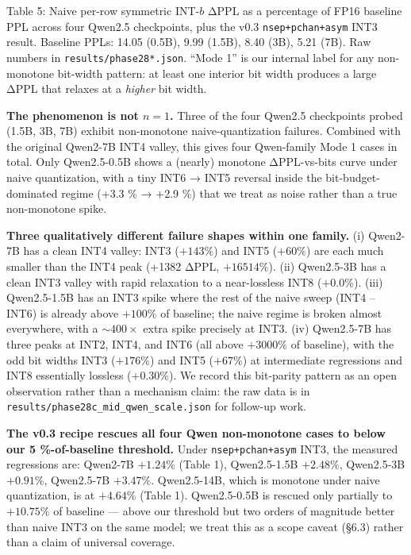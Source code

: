 Table 5: Naive per-row symmetric INT-\(b\) ΔPPL as a percentage of FP16
baseline PPL across four Qwen2.5 checkpoints, plus the v0.3
\texttt{nsep+pchan+asym} INT3 result. Baseline PPLs: 14.05 (0.5B), 9.99
(1.5B), 8.40 (3B), 5.21 (7B). Raw numbers in
\texttt{results/phase28*.json}. ``Mode 1'' is our internal label for any
non-monotone bit-width pattern: at least one interior bit width produces
a large ΔPPL that relaxes at a \emph{higher} bit width.

\textbf{The phenomenon is not \(n = 1\).} Three of the four Qwen2.5
checkpoints probed (1.5B, 3B, 7B) exhibit non-monotone
naive-quantization failures. Combined with the original Qwen2-7B INT4
valley, this gives four Qwen-family Mode 1 cases in total. Only
Qwen2.5-0.5B shows a (nearly) monotone ΔPPL-vs-bits curve under naive
quantization, with a tiny INT6 → INT5 reversal inside the
bit-budget-dominated regime (+3.3 \% → +2.9 \%) that we treat as noise
rather than a true non-monotone spike.

\textbf{Three qualitatively different failure shapes within one family.}
(i) Qwen2-7B has a clean INT4 valley: INT3 (\(+143 \%\)) and INT5
(\(+60 \%\)) are each much smaller than the INT4 peak (+1382 ΔPPL,
\(+16514 \%\)). (ii) Qwen2.5-3B has a clean INT3 valley with rapid
relaxation to a near-lossless INT8 (\(+0.0 \%\)). (iii) Qwen2.5-1.5B has
an INT3 spike where the rest of the naive sweep (INT4 -- INT6) is
already above \(+100 \%\) of baseline; the naive regime is broken almost
everywhere, with a \(\sim 400 \times\) extra spike precisely at INT3.
(iv) Qwen2.5-7B has three peaks at INT2, INT4, and INT6 (all above
\(+3000 \%\) of baseline), with the odd bit widths INT3 (\(+176 \%\))
and INT5 (\(+67 \%\)) at intermediate regressions and INT8 essentially
lossless (\(+0.30 \%\)). We record this bit-parity pattern as an open
observation rather than a mechanism claim: the raw data is in
\texttt{results/phase28c\_mid\_qwen\_scale.json} for follow-up work.

\textbf{The v0.3 recipe rescues all four Qwen non-monotone cases to
below our 5 \%-of-baseline threshold.} Under \texttt{nsep+pchan+asym}
INT3, the measured regressions are: Qwen2-7B \(+1.24 \%\) (Table 1),
Qwen2.5-1.5B \(+2.48 \%\), Qwen2.5-3B \(+0.91 \%\), Qwen2.5-7B
\(+3.47 \%\). Qwen2.5-14B, which is monotone under naive quantization,
is at \(+4.64 \%\) (Table 1). Qwen2.5-0.5B is rescued only partially to
\(+10.75 \%\) of baseline --- above our threshold but two orders of
magnitude better than naive INT3 on the same model; we treat this as a
scope caveat (§6.3) rather than a claim of universal coverage.

